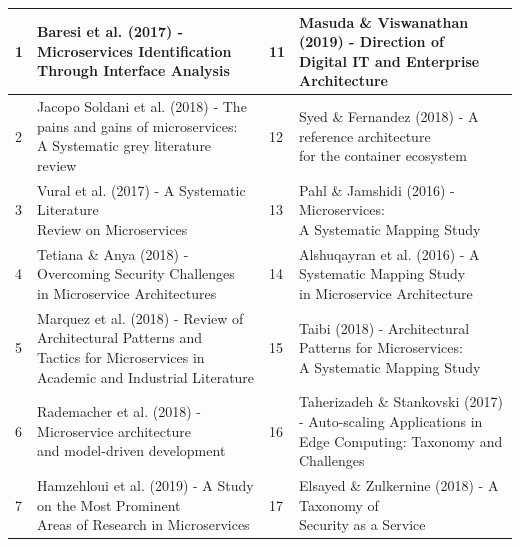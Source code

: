\documentclass{article}
\begin{document}
\begin{table}[h!]
  \begin{center}
 \tiny
    \begin{tabular}{|l|l|l|l|} %
    \hline
      1 & \makecell[l]{ Baresi et al. (2017) - Microservices Identification \\ Through Interface Analysis} & 11 & \makecell[l]{Masuda \& Viswanathan (2019) - Direction of \\ Digital IT and Enterprise Architecture}\\
      \hline
      2 & \makecell[l]{Jacopo Soldani et al. (2018) - The pains and gains of microservices: \\ A Systematic grey literature review} & 12 & \makecell[l]{Syed \& Fernandez (2018) - A reference architecture \\ for the container ecosystem}\\
      \hline
      3 & \makecell[l]{Vural et al. (2017) - A Systematic Literature \\ Review on Microservices} & 13 & \makecell[l]{Pahl \& Jamshidi (2016) - Microservices:  \\ A Systematic Mapping Study}\\
      \hline
      4 & \makecell[l]{Tetiana \& Anya (2018) - Overcoming Security Challenges \\ in Microservice Architectures} & 14 & \makecell[l]{Alshuqayran et al. (2016) - A Systematic Mapping Study \\ in Microservice Architecture}\\
      \hline
      5 & \makecell[l]{Marquez et al. (2018) - Review of Architectural Patterns and \\ Tactics for Microservices in Academic and Industrial Literature} & 15 & \makecell[l]{Taibi (2018) - Architectural Patterns for Microservices: \\ A Systematic Mapping Study}\\
      \hline
      6 & \makecell[l]{Rademacher et al. (2018) - Microservice architecture \\ and model-driven development} & 16 & \makecell[l]{Taherizadeh \& Stankovski (2017) - Auto-scaling Applications in \\ Edge Computing: Taxonomy and Challenges}\\
      \hline
      7 & \makecell[l]{Hamzehloui et al. (2019) - A Study on the Most Prominent \\ Areas of Research in Microservices} & 17 & \makecell[l]{Elsayed \& Zulkernine (2018) - A Taxonomy of \\ Security as a Service}\\

\end{tabular}
\end{center}
\end{table}
\end{document}
